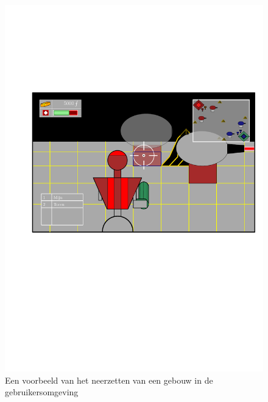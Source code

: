     \begin{figure}
    \centering
    \includegraphics[width=\textwidth]{../Graphics/UI2.pdf}
    \caption{Een voorbeeld van het neerzetten van een gebouw in de gebruikersomgeving}
    \label{fig:gebouw}
    \end{figure} 
